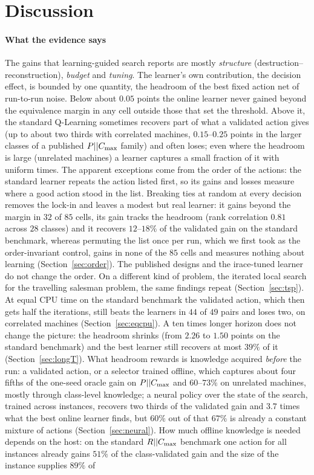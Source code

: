 \section{Discussion}
\label{sec:discussion}

\paragraph{What the evidence says} The gains that learning-guided search reports are mostly \emph{structure} (destruction--reconstruction), \emph{budget} and \emph{tuning}. The learner's own contribution, the decision effect, is bounded by one quantity, the headroom of the best fixed action net of run-to-run noise. Below about $0.05$ points the online learner never gained beyond the equivalence margin in any cell outside those that set the threshold. Above it, the standard Q-Learning sometimes recovers part of what a validated action gives (up to about two thirds with correlated machines, $0.15$--$0.25$ points in the larger classes of a published $P||C_{\max}$ family) and often loses; even where the headroom is large (unrelated machines) a learner captures a small fraction of it with uniform times. The apparent exceptions come from the order of the actions: the standard learner repeats the action listed first, so its gains and losses measure where a good action stood in the list. Breaking ties at random at every decision removes the lock-in and leaves a modest but real learner: it gains beyond the margin in $32$ of $85$ cells, its gain tracks the headroom (rank correlation $0.81$ across $28$ classes) and it recovers $12$--$18\%$ of the validated gain on the standard benchmark, whereas permuting the list once per run, which we first took as the order-invariant control, gains in none of the $85$ cells and measures nothing about learning (Section~\ref{sec:order}). The published designs and the irace-tuned learner do not change the order. On a different kind of problem, the iterated local search for the travelling salesman problem, the same findings repeat (Section~\ref{sec:tsp}). At equal CPU time on the standard benchmark the validated action, which then gets half the iterations, still beats the learners in $44$ of $49$ pairs and loses two, on correlated machines (Section~\ref{sec:eqcpu}). A ten times longer horizon does not change the picture: the headroom shrinks (from $2.26$ to $1.50$ points on the standard benchmark) and the best learner still recovers at most $39\%$ of it (Section~\ref{sec:longT}). What headroom rewards is knowledge acquired \emph{before} the run: a validated action, or a selector trained offline, which captures about four fifths of the one-seed oracle gain on $P||C_{\max}$ and $60$--$73\%$ on unrelated machines, mostly through class-level knowledge; a neural policy over the state of the search, trained across instances, recovers two thirds of the validated gain and $3.7$ times what the best online learner finds, but $60\%$ out of that $67\%$ is already a constant mixture of actions (Section~\ref{sec:neural}). How much offline knowledge is needed depends on the host: on the standard $R||C_{\max}$ benchmark one action for all instances already gains $51\%$ of the class-validated gain and the size of the instance supplies $89\%$ of 